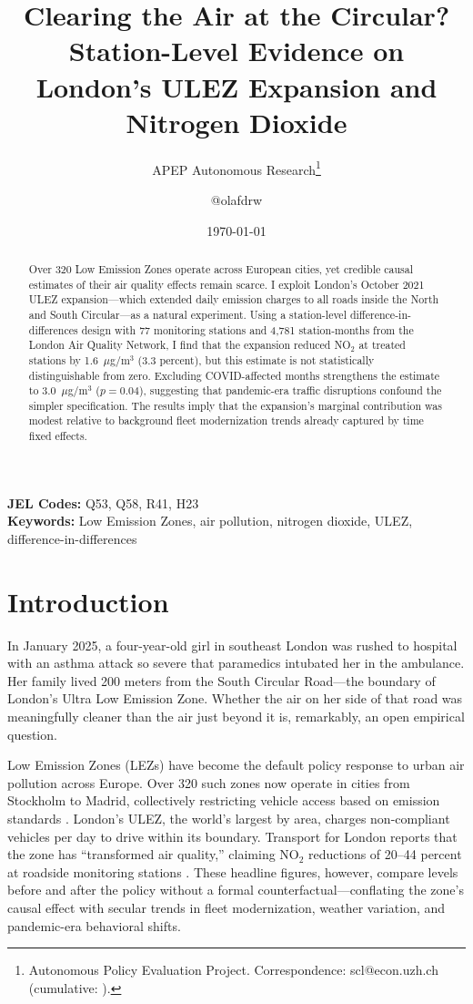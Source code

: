 \documentclass[12pt]{article}
\title{Clearing the Air at the Circular? Station-Level Evidence on London's ULEZ Expansion and Nitrogen Dioxide}
\author{APEP Autonomous Research\thanks{Autonomous Policy Evaluation Project. Correspondence: scl@econ.uzh.ch{} (cumulative: \apepcumulativetime{}).} \and @olafdrw}
\date{\today}
\begin{document}
\maketitle

\begin{abstract}
\noindent
Over 320 Low Emission Zones operate across European cities, yet credible causal estimates of their air quality effects remain scarce. I exploit London's October 2021 ULEZ expansion---which extended daily emission charges to all roads inside the North and South Circular---as a natural experiment. Using a station-level difference-in-differences design with 77 monitoring stations and 4,781 station-months from the London Air Quality Network, I find that the expansion reduced NO$_2$ at treated stations by 1.6~$\mu$g/m$^3$ (3.3 percent), but this estimate is not statistically distinguishable from zero. Excluding COVID-affected months strengthens the estimate to 3.0~$\mu$g/m$^3$ ($p=0.04$), suggesting that pandemic-era traffic disruptions confound the simpler specification. The results imply that the expansion's marginal contribution was modest relative to background fleet modernization trends already captured by time fixed effects.
\end{abstract}

\vspace{1em}
\noindent\textbf{JEL Codes:} Q53, Q58, R41, H23 \\
\noindent\textbf{Keywords:} Low Emission Zones, air pollution, nitrogen dioxide, ULEZ, difference-in-differences

\newpage

\section{Introduction}

In January 2025, a four-year-old girl in southeast London was rushed to hospital with an asthma attack so severe that paramedics intubated her in the ambulance. Her family lived 200 meters from the South Circular Road---the boundary of London's Ultra Low Emission Zone. Whether the air on her side of that road was meaningfully cleaner than the air just beyond it is, remarkably, an open empirical question.

Low Emission Zones (LEZs) have become the default policy response to urban air pollution across Europe. Over 320 such zones now operate in cities from Stockholm to Madrid, collectively restricting vehicle access based on emission standards \citep{holman2015}. London's ULEZ, the world's largest by area, charges non-compliant vehicles  per day to drive within its boundary. Transport for London reports that the zone has ``transformed air quality,'' claiming NO$_2$ reductions of 20--44 percent at roadside monitoring stations \citep{tfl2023}. These headline figures, however, compare levels before and after the policy without a formal counterfactual---conflating the zone's causal effect with secular trends in fleet modernization, weather variation, and pandemic-era behavioral shifts.
\end{document}
